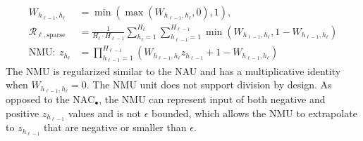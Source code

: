 \begin{align}
W_{h_{\ell-1},h_\ell} &= \min(\max(W_{h_{\ell-1},h_\ell}, 0), 1), \\
\mathcal{R}_{\ell,\mathrm{sparse}} &= \frac{1}{H_\ell \cdot H_{\ell-1}} \sum_{h_\ell=1}^{H_\ell} \sum_{h_{\ell-1}=1}^{H_{\ell-1}} \min\left(W_{h_{\ell-1},h_\ell}, 1 - W_{h_{\ell-1},h_\ell}\right) \\
\textrm{NMU}:\ z_{h_\ell} &= \prod_{h_{\ell-1}=1}^{H_{\ell-1}} \left(W_{h_{\ell-1},h_\ell} z_{h_{\ell-1}} + 1 - W_{h_{\ell-1},h_\ell} \right) \label{eq:nmu-defintion}
\end{align}
The NMU is regularized similar to the NAU and has a multiplicative identity when $W_{h_{\ell-1},h_\ell}=0$.
The NMU unit does not support division by design.
As opposed to the $\mathrm{NAC}_{\bullet}$, the NMU can represent input of both negative and positive $z_{h_{\ell-1}}$ values and is not $\epsilon$ bounded, which allows the NMU to extrapolate to $z_{h_{\ell-1}}$ that are negative or smaller than $\epsilon$.



